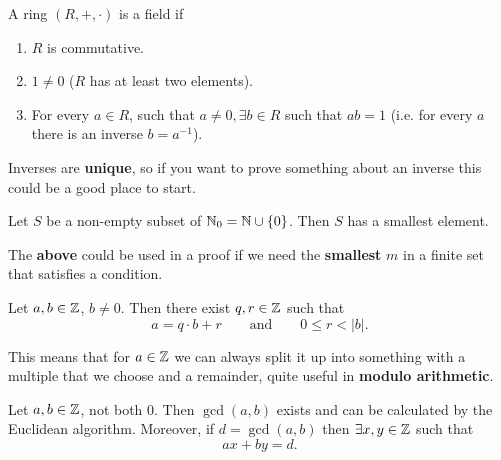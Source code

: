 \documentclass[10pt, a4paper]{article}
\begin{document}
\begin{definition}
    A ring $(R, +, \cdot)$ is a field if
    \begin{enumerate}[label = (\roman*)]
        \item $R$ is commutative.

        \item $1 \neq 0$
        ($R$ has at least two elements).

        \item For every $a \in R$,
        such that $a \neq 0, \exists b \in R$ such that $ab = 1$
        (i.e. for every $a$ there is an inverse $b = a ^ {-1}$).
    \end{enumerate}
\end{definition}

\begin{remark}
    Inverses are \textbf{unique},
    so if you want to prove something about an inverse this could be a good place to start.
\end{remark}

\vspace{1em}

\begin{lemma}
    Let $S$ be a non-empty subset of $\mathbb{N}_0 = \mathbb{N} \cup \{0\}$.
    Then $S$ has a smallest element.
\end{lemma}

\vspace{0.5em}

\begin{remark}
    The \textbf{above} could be used in a proof if we need the \textbf{smallest} $m$ in a finite set that satisfies a condition.
\end{remark}

\vspace{1em}

\begin{proposition}
    Let $a, b \in \mathbb{Z}$,
    $b \neq 0$.
    Then there exist $q, r \in \mathbb{Z}$ such that 
    \[
    a = q \cdot b + r\qquad\text{and}\qquad 0 \leq r < |b|.
    \]
\end{proposition}

\begin{remark}
    This means that for $a \in \mathbb{Z}$ we can always split it up into something with a multiple that we choose and a remainder,
    quite useful in \textbf{modulo arithmetic}.
\end{remark}

\begin{theorem}
    Let $a, b \in \mathbb{Z}$,
    not both $0$.
    Then $\gcd(a, b)$ exists and can be calculated by the Euclidean algorithm.
    Moreover,
    if $d = \gcd(a, b)$ then $\exists x, y \in \mathbb{Z}$ such that
    \[
    ax + by = d.
    \]
\end{theorem}
\end{document}
